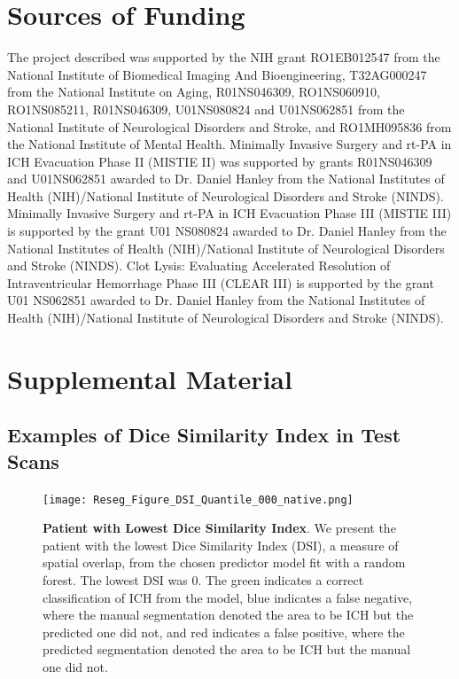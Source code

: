 \section*{Sources of Funding}
The project described was supported by the NIH grant RO1EB012547 from the National Institute of Biomedical Imaging And Bioengineering, T32AG000247 from the National Institute on Aging, R01NS046309, RO1NS060910, RO1NS085211, R01NS046309, U01NS080824 and U01NS062851 from the National Institute of Neurological Disorders and Stroke, and RO1MH095836 from the National Institute of Mental Health. Minimally Invasive Surgery and rt-PA in ICH Evacuation Phase II (MISTIE II) was supported by grants R01NS046309 and U01NS062851 awarded to Dr. Daniel Hanley from the National Institutes of Health (NIH)/National Institute of Neurological Disorders and Stroke (NINDS).  Minimally Invasive Surgery and rt-PA in ICH Evacuation Phase III (MISTIE III) is supported by the grant U01 NS080824 awarded to Dr. Daniel Hanley from the National Institutes of Health (NIH)/National Institute of Neurological Disorders and Stroke (NINDS). Clot Lysis: Evaluating Accelerated Resolution of Intraventricular Hemorrhage Phase III (CLEAR III) is supported by the grant U01 NS062851 awarded to Dr. Daniel Hanley from the National Institutes of Health (NIH)/National Institute of Neurological Disorders and Stroke (NINDS). 

\newpage
%
%
%
\printbibliography

\clearpage
\section{Supplemental Material}

\subsection{Examples of Dice Similarity Index in Test Scans}

\begin{figure}
\centering
\texttt{[image: Reseg\_Figure\_DSI\_Quantile\_000\_native.png]}
\caption{{\bf Patient with  Lowest Dice Similarity Index}. We present the patient with the lowest Dice Similarity Index (DSI), a measure of spatial overlap, from the chosen predictor model fit with a random forest.  The lowest DSI was 0. The green indicates a correct classification of ICH from the model, blue indicates a false negative, where the manual segmentation denoted the area to be ICH but the predicted one did not, and red indicates a false positive, where the predicted segmentation denoted the area to be ICH but the manual one did not. }
\label{fig:dice_img0}
\end{figure}

